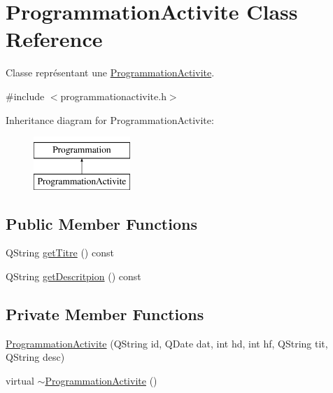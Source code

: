 \hypertarget{class_programmation_activite}{}\section{Programmation\+Activite Class Reference}
\label{class_programmation_activite}


Classe représentant une \hyperlink{class_programmation_activite}{Programmation\+Activite}.  




{\ttfamily \#include $<$programmationactivite.\+h$>$}

Inheritance diagram for Programmation\+Activite\+:\begin{figure}[H]
\begin{center}
\leavevmode
\includegraphics[height=2.000000cm]{class_programmation_activite}
\end{center}
\end{figure}
\subsection*{Public Member Functions}
\begin{DoxyCompactItemize}
\item 
Q\+String \hyperlink{class_programmation_activite_a8a29a5c0e39ad57aaf2ed73c8a004d3c}{get\+Titre} () const 
\item 
Q\+String \hyperlink{class_programmation_activite_a91de19dc76479adeddac07b5a259c026}{get\+Descritpion} () const 
\end{DoxyCompactItemize}
\subsection*{Private Member Functions}
\begin{DoxyCompactItemize}
\item 
\hyperlink{class_programmation_activite_a2492901bfd220779a942fabade7486d1}{Programmation\+Activite} (Q\+String id, Q\+Date dat, int hd, int hf, Q\+String tit, Q\+String desc)
\item 
virtual \hyperlink{class_programmation_activite_acd35d754d36b98a94b5b846378100c33}{$\sim$\+Programmation\+Activite} ()
\end{DoxyCompactItemize}
